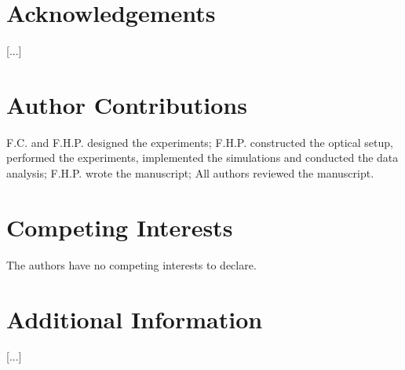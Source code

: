 \documentclass[10pt]{article}
\begin{document}






\printbibliography

\section*{Acknowledgements}
[...]

\section*{Author Contributions}
F.C. and F.H.P. designed the experiments; 
F.H.P. constructed the optical setup, performed the experiments, implemented the simulations and conducted the data analysis; 
F.H.P. wrote the manuscript; 
All authors reviewed the manuscript.

\section*{Competing Interests}
The authors have no competing interests to declare. 

\section*{Additional Information}
[...]












\onecolumn
\end{document}
